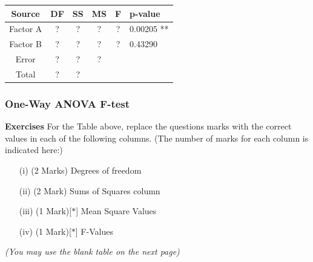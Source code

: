 \documentclass[a4paper,12pt]{article}
\begin{document}
	\begin{center}
		\begin{tabular}{|c||c|c|c|c|l|}
			\hline Source & DF & SS & MS & F & p-value \\ \hline 
			\hline Factor A & \phantom{mak} ? \phantom{mak}  & \phantom{mak} ? \phantom{mak}  & \phantom{mak} ? \phantom{mak}  & \phantom{mak} ? \phantom{mak}  &0.00205 ** \\ \hline
			\hline Factor B & \phantom{mak} ? \phantom{mak}  & \phantom{mak} ? \phantom{mak}  & \phantom{mak} ? \phantom{mak}  & \phantom{mak} ? \phantom{mak}  & 0.43290    \\ \hline
			\hline Error &  ? & ? & \phantom{mak} ? \phantom{mak}  &  &  \\ 
			\hline \hline Total & ? & ? &  &  &  \\ 
			\hline 
		\end{tabular}
	\end{center} 
	
	
	\newpage
	
	
	
	
	
	
	
	
	
	

\subsubsection*{One-Way ANOVA F-test}

\noindent \textbf{Exercises}
For the Table above, replace the questions marks with the correct values in each of the following columns. (The number of marks for each column is indicated here:)
\begin{itemize}
	\item[(i)] (2 Marks) Degrees of freedom 
	\item[(ii)](2 Mark) Sums of Squares column
	\item[(iii)](1 Mark)[$\ast$] Mean Square Values
	\item[(iv)](1 Mark)[$\ast$] F-Values
\end{itemize}
\textit{(You may use the blank table on the next page)}
\newpage
\end{document}
